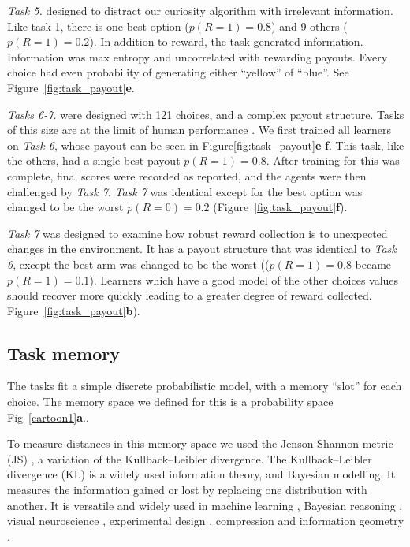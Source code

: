 \textit{Task 5.} designed to distract our curiosity algorithm with irrelevant information. Like task 1, there is one best option ($p(R=1) = 0.8$) and 9 others ($p(R=1) = 0.2$). In addition to reward, the task generated information. Information was max entropy and uncorrelated with rewarding payouts. Every choice had even probability of generating either ``yellow'' of ``blue''. See Figure~\ref{fig:task_payout}\textbf{e}.  

\textit{Tasks 6-7.} were designed with 121 choices, and a complex payout structure. Tasks of this size are at the limit of human performance \cite{Wu2018}. We first trained all learners on \textit{Task 6}, whose payout can be seen in Figure\ref{fig:task_payout}\textbf{e}-\textbf{f}. This task, like the others, had a single best payout $p(R=1) = 0.8$. After training for this was complete, final scores were recorded as reported, and the agents were then challenged by \textit{Task 7}. \textit{Task 7} was identical except for the best option was changed to be the worst $p(R=0) = 0.2$ (Figure~\ref{fig:task_payout}\textbf{f}). 

\textit{Task 7} was designed to examine how robust reward collection is to unexpected changes in the environment. It has a payout structure that was identical to \textit{Task 6}, except the best arm was changed to be the worst (($p(R=1) = 0.8$ became $p(R=1) = 0.1$). Learners which have a good model of the other choices values should recover more quickly leading to a greater degree of reward collected. Figure~\ref{fig:task_payout}\textbf{b}). 

\subsection*{Task memory}
The tasks fit a simple discrete probabilistic model, with a memory “slot” for each choice. The memory space we defined for this is a probability space Fig~\ref{cartoon1}\textbf{a}..

To measure distances in this memory space we used the Jenson-Shannon metric (JS) \cite{Endres2003}, a variation of the Kullback--Leibler divergence. The Kullback--Leibler divergence (KL) is a widely used information theory, and Bayesian modelling. It measures the information gained or lost by replacing one distribution with another. It is versatile and widely used in machine learning \cite{Goodfellow-et-al-2016}, Bayesian reasoning \cite{Itti2009}, visual neuroscience \cite{Itti2009}, experimental design \cite{Lopez-Fidalgo2007}, compression \cite{Mackay,Still2012} and information geometry \cite{Ay2015}.

